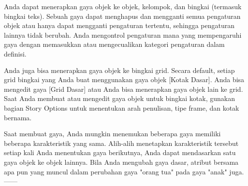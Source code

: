 Anda dapat menerapkan gaya objek ke objek, kelompok, dan bingkai (termasuk bingkai teks). Sebuah gaya dapat menghapus dan mengganti semua pengaturan objek atau hanya dapat mengganti pengaturan tertentu, sehingga pengaturan lainnya tidak berubah. Anda mengontrol pengaturan mana yang mempengaruhi gaya dengan memasukkan atau mengecualikan kategori pengaturan dalam definisi.

Anda juga bisa menerapkan gaya objek ke bingkai grid. Secara default, setiap grid bingkai yang Anda buat menggunakan gaya objek [Kotak Dasar]. Anda bisa mengedit gaya [Grid Dasar] atau Anda bisa menerapkan gaya objek lain ke grid. Saat Anda membuat atau mengedit gaya objek untuk bingkai kotak, gunakan bagian Story Options untuk menentukan arah penulisan, tipe frame, dan kotak bernama.

Saat membuat gaya, Anda mungkin menemukan beberapa gaya memiliki beberapa karakteristik yang sama. Alih-alih menetapkan karakteristik tersebut setiap kali Anda menentukan gaya berikutnya, Anda dapat mendasarkan satu gaya objek ke objek lainnya. Bila Anda mengubah gaya dasar, atribut bersama apa pun yang muncul dalam perubahan gaya "orang tua" pada gaya "anak" juga.
------
